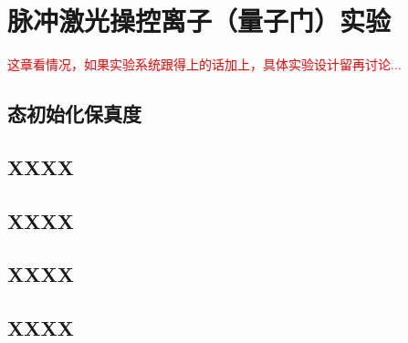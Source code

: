 
\chapter[脉冲激光操控离子（量子门）实验]{脉冲激光操控离子（量子门）实验}

\textcolor{red}{\small
这章看情况，如果实验系统跟得上的话加上，具体实验设计留再讨论...
}

\section[态初始化保真度]{态初始化保真度}

\section[XXXX]{XXXX}

\section[XXXX]{XXXX}

\section[XXXX]{XXXX}

\section[XXXX]{XXXX}

